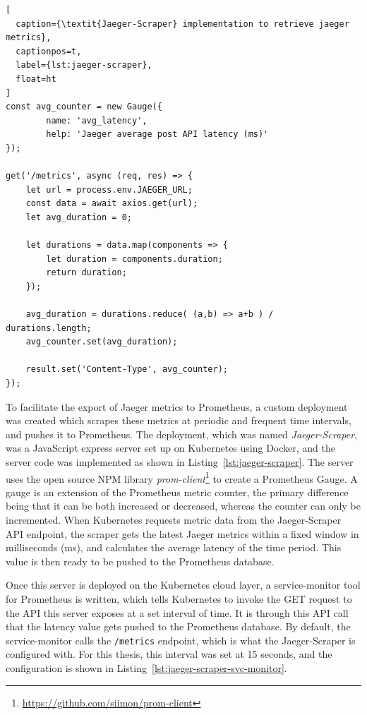 \begin{lstlisting}[
  caption={\textit{Jaeger-Scraper} implementation to retrieve jaeger metrics},
  captionpos=t,
  label={lst:jaeger-scraper},
  float=ht
]
const avg_counter = new Gauge({
        name: 'avg_latency',
        help: 'Jaeger average post API latency (ms)'
});

get('/metrics', async (req, res) => {
    let url = process.env.JAEGER_URL;
    const data = await axios.get(url);
    let avg_duration = 0;

    let durations = data.map(components => {
        let duration = components.duration;
        return duration;
    });

    avg_duration = durations.reduce( (a,b) => a+b ) / durations.length;
    avg_counter.set(avg_duration);

    result.set('Content-Type', avg_counter);
});
\end{lstlisting}

To facilitate the export of Jaeger metrics to Prometheus, a custom deployment was created which scrapes these metrics at periodic and frequent time intervals, and pushes it to Prometheus. The deployment, which was named \textit{Jaeger-Scraper}, was a JavaScript express server set up on Kubernetes using Docker, and the server code was implemented as shown in Listing~\ref{lst:jaeger-scraper}. The server uses the open source NPM library \textit{prom-client}\footnote{\url{https://github.com/siimon/prom-client}} to create a Prometheus Gauge. A gauge is an extension of the Prometheus metric counter, the primary difference being that it can be both increased or decreased, whereas the counter can only be incremented. When Kubernetes requests metric data from the Jaeger-Scraper API endpoint, the scraper gets the latest Jaeger metrics within a fixed window in milliseconds (ms), and calculates the average latency of the time period. This value is then ready to be pushed to the Prometheus database.

Once this server is deployed on the Kubernetes cloud layer, a service-monitor tool for Prometheus is written, which tells Kubernetes to invoke the GET request to the API this server exposes at a set interval of time. It is through this API call that the latency value gets pushed to the Prometheus database. By default, the service-monitor calls the \texttt{/metrics} endpoint, which is what the Jaeger-Scraper is configured with. For this thesis, this interval was set at 15 seconds, and the configuration is shown in Listing~\ref{lst:jaeger-scraper-svc-monitor}.

